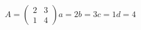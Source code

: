 \documentclass[preview]{standalone}
\begin{document}
\begin{center}
$ A = \begin{pmatrix} 2 & 3 \\ 1 & 4 \end{pmatrix} $$ a = 2 $\text{ }$ b = 3 $\text{ }$ c = 1 $\text{ }$ d = 4 $
\end{center}
\end{document}

